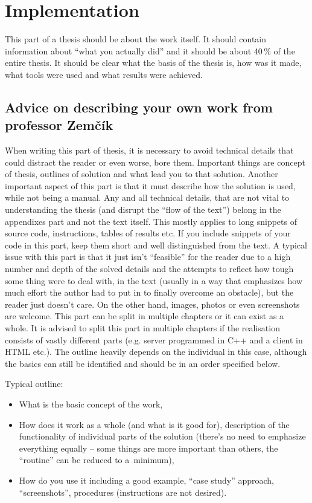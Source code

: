 \section{Implementation}
\label{implementace}

This part of a thesis should be about the work itself. It should contain information about ``what you actually did'' and it should be about 40\,\% of the entire thesis. It should be clear what the basis of the thesis is, how was it made, what tools were used and what results were achieved.

\subsection*{Advice on describing your own work from professor Zemčík}

When writing this part of thesis, it is necessary to avoid technical details that could distract the reader or even worse, bore them. Important things are concept of thesis, outlines of solution and what lead you to that solution.
Another important aspect of this part is that it must describe how the solution is used, while not being a manual.
Any and all technical details, that are not vital to understanding the thesis (and disrupt the ``flow of the text'') belong in the appendixes part and not the text itself. This mostly applies to long snippets of source code, instructions, tables of results etc. If you include snippets of your code in this part, keep them short and well distinguished from the text. A typical issue with this part is that it just isn't ``feasible'' for the reader due to a high number and depth of the solved details and the attempts to reflect how tough some thing were to deal with, in the text (usually in a way that emphasizes how much effort the author had to put in to finally overcome an obstacle), but the reader just doesn't care. On the other hand, images, photos or even screenshots are welcome. This part can be split in multiple chapters or it can exist as a whole. It is advised to split this part in multiple chapters if the realisation consists of vastly different parts (e.g. server programmed in C++ and a client in HTML etc.). The outline heavily depends on the individual in this case, although the basics can still be identified and should be in an order specified below.
\bigskip

\begin{samepage}
\noindent Typical outline: 
\begin{itemize}
  \item{What is the basic concept of the work,}
  \item{How does it work as a whole (and what is it good for), description of the functionality of individual parts of the solution (there's no need to emphasize everything equally -- some things are more important than others, the ``routine'' can be reduced to a~minimum),}
  \item{How do you use it including a good example, ``case study'' approach, ``screenshots'', procedures (instructions are not desired).}
\end{itemize}
\end{samepage}


